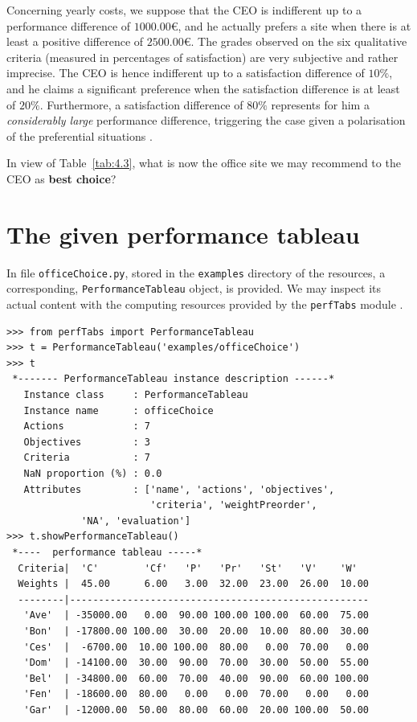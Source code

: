 Concerning yearly costs, we suppose that the CEO is indifferent up to a performance difference of $1000.00$€, and he actually prefers a site when there is at least a positive difference of $2500.00$€. The grades observed on the six qualitative criteria (measured in percentages of satisfaction) are very subjective and rather imprecise. The CEO is hence indifferent up to a satisfaction difference of $10\%$, and he claims a significant preference when the satisfaction difference is at least of $20\%$.  Furthermore, a satisfaction difference of $80\%$ represents for him a \emph{considerably large} performance difference, triggering the case given a polarisation of the preferential situations \citep{BIS-2013}. 

In view of Table~\ref{tab:4.3}, what is now the office site we may recommend to the CEO as \textbf{best choice}?

\section{The given performance tableau}
\label{sec:4.2}


In file \texttt{officeChoice.py}, stored in the \texttt{examples} directory of the \Digraph resources, a corresponding, \texttt{PerformanceTableau} object, is provided. We may inspect its actual content with the computing resources provided by the \texttt{perfTabs} module .
\begin{lstlisting}[caption={Inspecting the \texttt{officeChoice} performance tableau.},label=list:4.1]
>>> from perfTabs import PerformanceTableau
>>> t = PerformanceTableau('examples/officeChoice')
>>> t
 *------- PerformanceTableau instance description ------*
   Instance class     : PerformanceTableau
   Instance name      : officeChoice
   Actions            : 7
   Objectives         : 3
   Criteria           : 7
   NaN proportion (%) : 0.0
   Attributes         : ['name', 'actions', 'objectives',
                         'criteria', 'weightPreorder',
			 'NA', 'evaluation']
>>> t.showPerformanceTableau()
 *----  performance tableau -----*
  Criteria|  'C'        'Cf'   'P'   'Pr'   'St'   'V'    'W'   
  Weights |  45.00      6.00   3.00  32.00  23.00  26.00  10.00    
  --------|----------------------------------------------------
   'Ave'  | -35000.00   0.00  90.00 100.00 100.00  60.00  75.00  
   'Bon'  | -17800.00 100.00  30.00  20.00  10.00  80.00  30.00  
   'Ces'  |  -6700.00  10.00 100.00  80.00   0.00  70.00   0.00  
   'Dom'  | -14100.00  30.00  90.00  70.00  30.00  50.00  55.00  
   'Bel'  | -34800.00  60.00  70.00  40.00  90.00  60.00 100.00  
   'Fen'  | -18600.00  80.00   0.00   0.00  70.00   0.00   0.00  
   'Gar'  | -12000.00  50.00  80.00  60.00  20.00 100.00  50.00  
\end{lstlisting}

